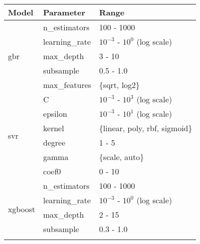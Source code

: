 \begin{table*}[h]
\centering
\begin{tabular}{@{}l>{\ttfamily}lp{}@{}}
\toprule
\textbf{Model}                 & \textbf{Parameter}          & \textbf{Range}                           \\ \midrule
\multirow{5}{*}{\gls{gbr}}     & n\_estimators               & 100 - 1000                                \\ \cmidrule{2-3}
                               & learning\_rate              & $10^{-3}$ - $10^{0}$ (log scale)          \\ \cmidrule{2-3}
                               & max\_depth                  & 3 - 10                                    \\ \cmidrule{2-3}
                               & subsample                   & 0.5 - 1.0                                 \\ \cmidrule{2-3}
                               & max\_features               & \{sqrt, log2\}                            \\ \midrule
\multirow{6}{*}{\gls{svr}}     & C                           & $10^{-3}$ - $10^{3}$ (log scale)          \\ \cmidrule{2-3}
                               & epsilon                     & $10^{-3}$ - $10^{1}$ (log scale)          \\ \cmidrule{2-3}
                               & kernel                      & \{linear, poly, rbf, sigmoid\}            \\ \cmidrule{2-3}
                               & degree                      & 1 - 5                                     \\ \cmidrule{2-3}
                               & gamma                       & \{scale, auto\}                           \\ \cmidrule{2-3}
                               & coef0                       & 0 - 10                                    \\ \midrule
\multirow{8}{*}{\gls{xgboost}} & n\_estimators               & 100 - 1000                                \\ \cmidrule{2-3}
                               & learning\_rate              & $10^{-3}$ - $10^{0}$ (log scale)          \\ \cmidrule{2-3}
                               & max\_depth                  & 2 - 15                                    \\ \cmidrule{2-3}
                               & subsample                   & 0.3 - 1.0                                 \\ \cmidrule{2-3}

\end{tabular}
\end{table*}
